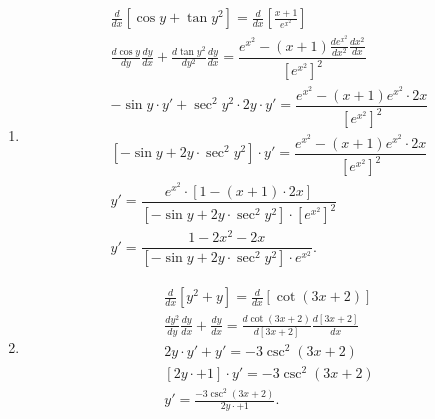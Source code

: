 \documentclass{hwset}
\begin{document}
\begin{enumerate}
	\item \begin{solution}
		\begin{align*}
			&\frac{d}{dx}\left[ \cos y + \tan y^2 \right] = \frac{d}{dx}\left[
				\frac{x+1}{e^{x^2}} \right] \\
			&\frac{d\cos y}{dy}\frac{dy}{dx} + \frac{d\tan
				y^2}{dy^2}\frac{dy}{dx} = \dfrac{e^{x^2} -
				(x+1)\frac{de^{x^2}}{dx^2}\frac{dx^2}{dx}}{\left[ e^{x^2} \right]^2} \\
			&-\sin y \cdot y' + \sec^2 y^2 \cdot 2y \cdot y' = \dfrac{e^{x^2} -
				(x+1)e^{x^2}\cdot 2x}{\left[ e^{x^2} \right]^2} \\
			&\left[ -\sin y  + 2y\cdot \sec^2 y^2 \right]\cdot y' = \dfrac{e^{x^2} -
				(x+1)e^{x^2}\cdot 2x}{\left[ e^{x^2} \right]^2} \\
			&y' = \dfrac{e^{x^2}\cdot \left[1 - (x+1)\cdot 2x \right]}{\left[ -\sin y  + 2y\cdot
				\sec^2 y^2 \right]\cdot \left[ e^{x^2} \right]^2} \\
			&\boxed{y' = \dfrac{1 - 2x^2 - 2x}{\left[ -\sin y  + 2y\cdot
				\sec^2 y^2 \right]\cdot e^{x^2}}}.
		\end{align*}
	\end{solution}
	\item \begin{solution}
		\begin{align*}
			&\frac{d}{dx}\left[ y^2 + y \right] = \frac{d}{dx}\left[ \cot (3x+2)
				\right]\\
			&\frac{dy^2}{dy}\frac{dy}{dx} + \frac{dy}{dx} = \frac{d\cot (3x+2)}{d[3x
				+2]}\frac{d[3x+2]}{dx} \\
			&2y\cdot y' + y' = -3\csc^2 (3x+2) \\
			&\left[ 2y\cdot + 1 \right] \cdot y' = -3\csc^2 (3x+2) \\
			&\boxed{y' = \frac{-3\csc^2 (3x+2)}{ 2y\cdot + 1}}.
		\end{align*}
	\end{solution}
\end{enumerate}
\end{document}
